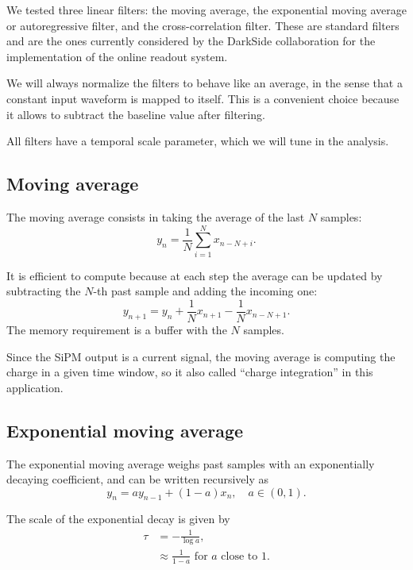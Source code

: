 We tested three linear filters: the moving average, the exponential moving
average or autoregressive filter, and the cross-correlation filter. These are
standard filters and are the ones currently considered by the DarkSide
collaboration for the implementation of the online readout system.

We will always normalize the filters to behave like an average, in the sense
that a constant input waveform is mapped to itself. This is a convenient choice
because it allows to subtract the baseline value after filtering.

All filters have a temporal scale parameter, which we will tune in the analysis.

\subsection{Moving average}

The moving average consists in taking the average of the last $N$ samples:
%
\begin{equation}
    y_n = \frac1N \sum_{i=1}^N x_{n-N+i}.
\end{equation}

It is efficient to compute because at each step the average can be updated by
subtracting the $N$-th past sample and adding the incoming one:
%
\begin{equation}
    y_{n+1} = y_n + \frac1N x_{n+1} - \frac1N x_{n-N+1}.
\end{equation}
%
The memory requirement is a buffer with the $N$ samples.

Since the SiPM output is a current signal, the moving average is computing
the charge in a given time window, so it also called ``charge integration''
in this application.

\subsection{Exponential moving average}

The exponential moving average weighs past samples with an exponentially
decaying coefficient, and can be written recursively as
%
\begin{equation}
    y_n = a y_{n-1} + (1 - a) x_n, \quad a \in (0, 1).
\end{equation}

The scale of the exponential decay is given by
%
\begin{align}
    \tau &= -\frac1{\log a}, \\
    &\approx \frac1{1-a} \text{ for $a$ close to 1.}
\end{align}

